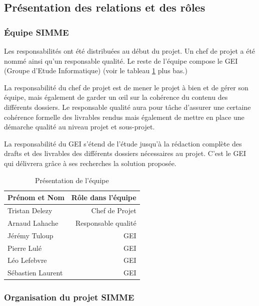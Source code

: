 \documentclass{mise_en_page}
\begin{document}
\subsection{Présentation des relations et des rôles}

\subsubsection{Équipe SIMME}

Les responsabilités ont été distribuées au début du projet. Un chef de projet a été nommé ainsi qu'un responsable qualité. Le reste de l'équipe compose le GEI (Groupe d'Etude Informatique) (voir le tableau \ref{tab_equipe} plus bas.)

La responsabilité du chef de projet est de mener le projet à bien et de gérer son équipe, mais également de garder un \oe{}il sur la cohérence du contenu des différents dossiers. Le responsable qualité aura pour tâche d'assurer une certaine cohérence formelle des livrables rendus mais également de mettre en place une démarche qualité au niveau projet et sous-projet.

La responsabilité du GEI s'étend de l'étude jusqu'à la rédaction complète des drafts et des livrables des différents dossiers nécessaires au projet. C'est le GEI qui délivrera grâce à ses recherches la solution proposée.

\begin{table}[h]
	\centering
	\begin{tabular}{l r}
		\toprule
		\textbf{Prénom et Nom} & \textbf{Rôle dans l'équipe}\\
		\toprule
		Tristan Delezy & Chef de Projet \\
		Arnaud Lahache & Responsable qualité \\
		\midrule
		Jérémy Tuloup & GEI \\
		Pierre Lulé & GEI \\
		Léo Lefebvre & GEI \\
		Sébastien Laurent & GEI \\
		\bottomrule
	\end{tabular}
	\caption{\label{tab_equipe} Présentation de l'équipe}
\end{table}

\subsubsection{Organisation du projet SIMME}
\end{document}
